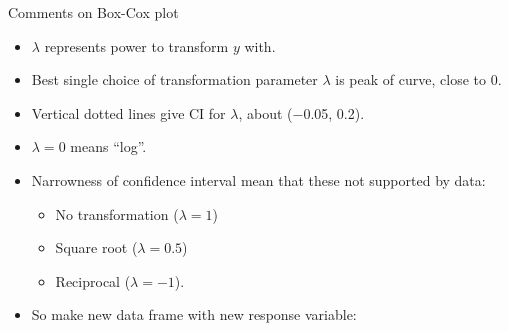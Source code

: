 \documentclass[
  ignorenonframetext,
]{beamer}
\newenvironment{Shaded}{\begin{snugshade}}{\end{snugshade}}
\newcommand{\DataTypeTok}[1]{\textcolor[rgb]{0.13,0.29,0.53}{#1}}
\newcommand{\DecValTok}[1]{\textcolor[rgb]{0.00,0.00,0.81}{#1}}
\newcommand{\KeywordTok}[1]{\textcolor[rgb]{0.13,0.29,0.53}{\textbf{#1}}}
\newcommand{\NormalTok}[1]{#1}
\newcommand{\OperatorTok}[1]{\textcolor[rgb]{0.81,0.36,0.00}{\textbf{#1}}}
\newcommand{\StringTok}[1]{\textcolor[rgb]{0.31,0.60,0.02}{#1}}
\providecommand{\tightlist}{%
  \setlength{\itemsep}{0pt}\setlength{\parskip}{0pt}}
\begin{document}
\begin{frame}[fragile]{Comments on Box-Cox plot}
\protect\hypertarget{comments-on-box-cox-plot}{}

\begin{itemize}
\tightlist
\item
  \(\lambda\) represents power to transform \(y\) with.
\item
  Best single choice of transformation parameter \(\lambda\) is peak of
  curve, close to 0.
\item
  Vertical dotted lines give CI for \(\lambda\), about (−0.05, 0.2).
\item
  \(\lambda = 0\) means ``log''.
\item
  Narrowness of confidence interval mean that these not supported by
  data:

  \begin{itemize}
  \tightlist
  \item
    No transformation (\(\lambda = 1\))
  \item
    Square root (\(\lambda = 0.5\))
  \item
    Reciprocal (\(\lambda = −1\)).
  \end{itemize}
\item
  So make new data frame with new response variable:
\end{itemize}

\begin{Shaded}
\end{Shaded}

\end{frame}
\end{document}
